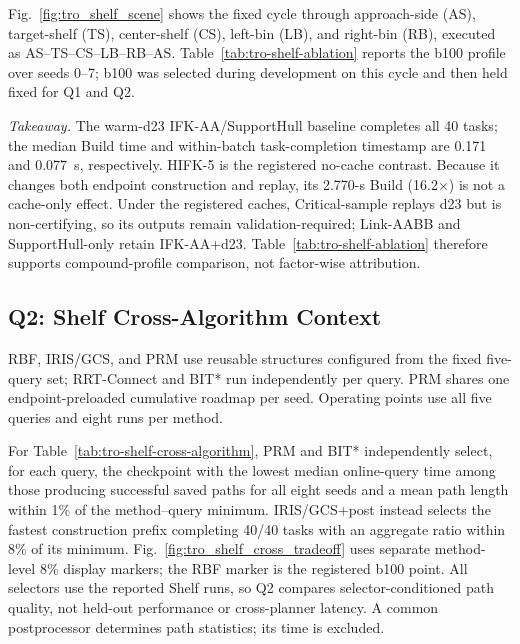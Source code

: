 \documentclass[journal]{IEEEtran}
\newcommand{\rbf}{RBF}
\newcommand{\TableFontRestore}{}
\begin{document}
Fig.~\ref{fig:tro_shelf_scene} shows the fixed cycle through approach-side (AS),
target-shelf (TS), center-shelf (CS), left-bin (LB), and right-bin (RB),
executed as AS--TS--CS--LB--RB--AS\@. Table~\ref{tab:tro-shelf-ablation}
reports the b100 profile over seeds 0--7; b100 was selected during development
on this cycle and then held fixed for Q1 and Q2.

\noindent\emph{Takeaway.}
The warm-d23 IFK-AA/SupportHull baseline completes all 40 tasks; the median
Build time and within-batch task-completion timestamp are 0.171 and 0.077~s,
respectively.
HIFK-5 is the registered no-cache contrast. Because it changes both
endpoint construction and replay, its 2.770-s Build (16.2$\times$) is not a
cache-only effect. Under the registered caches, Critical-sample replays d23 but
is non-certifying, so its outputs remain validation-required; Link-AABB and
SupportHull-only retain IFK-AA+d23.
Table~\ref{tab:tro-shelf-ablation} therefore supports compound-profile
comparison, not factor-wise attribution.

\setcounter{dbltopnumber}{2}
\begin{table}[t]
\centering
\TableFontRestore

\end{table}

\begin{table}[t]
\centering
\TableFontRestore

\end{table}

\subsection{Q2: Shelf Cross-Algorithm Context}
\label{sec:exp_shelf_cross_algorithm}

\rbf{}, IRIS/GCS, and PRM use reusable structures configured from the fixed
five-query set; RRT-Connect and BIT* run independently per query. PRM shares one
endpoint-preloaded cumulative roadmap per seed. Operating points use all five
queries and eight runs per method.

For Table~\ref{tab:tro-shelf-cross-algorithm}, PRM and BIT* independently
select, for each query, the checkpoint with the lowest median online-query time
among those
producing successful saved paths for all eight seeds and a mean path length
within 1\% of the method--query minimum. \mbox{IRIS/GCS+post} instead selects the
fastest construction prefix completing 40/40 tasks with an aggregate ratio within 8\% of
its minimum.
Fig.~\ref{fig:tro_shelf_cross_tradeoff} uses separate method-level 8\% display
markers; the \rbf{} marker is the registered b100 point. All selectors use the
reported Shelf runs, so Q2 compares selector-conditioned path quality, not
held-out performance or cross-planner latency. A common postprocessor determines
path statistics; its time is excluded.
\end{document}
